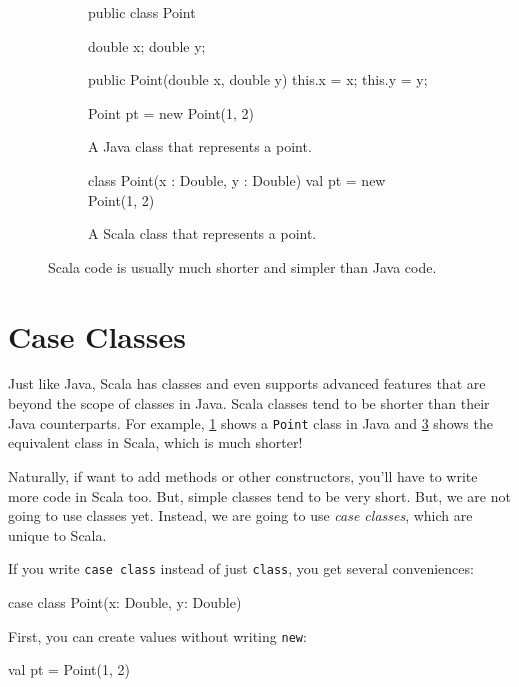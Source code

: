 \documentclass{book}
\begin{document}
\begin{figure}
\begin{subfigure}[b]{.45\textwidth}
\begin{javacode}
public class Point {

  double x;
  double y;

  public Point(double x, double y) {
    this.x = x;
    this.y = y;
  }

}

Point pt = new Point(1, 2)
\end{javacode}
\caption{A Java class that represents a point.}\label{javapoint}
\end{subfigure}
\vrule
%
\begin{subfigure}[b]{.45\textwidth}
\begin{scalacode}
class Point(x : Double, y : Double)
val pt = new Point(1, 2)
\end{scalacode}
\caption{A Scala class that represents a point.}\label{scalapoint}
\end{subfigure}
\caption{Scala code is usually much shorter and simpler than Java code.}
\end{figure}

\section{Case Classes}

Just like Java, Scala has classes and even supports advanced features that are
beyond the scope of classes in Java. Scala classes tend to be shorter than their
Java counterparts. For example, \cref{javapoint} shows a \verb|Point| class
in Java and \cref{scalapoint} shows the equivalent class in Scala, which
is much shorter!

Naturally, if want to add methods or other constructors, you'll have to write
more code in Scala too. But, simple classes tend to be very short.
But, we are not going to use classes yet. Instead, we are going to use
\emph{case classes}, which are unique to Scala.

If you write \verb|case class| instead of just \verb|class|, you get several
conveniences:

\begin{scalacode}
case class Point(x: Double, y: Double)
\end{scalacode}

First, you can create values without writing \verb|new|:

\begin{scalacode}
val pt = Point(1, 2)
\end{scalacode}
\end{document}
